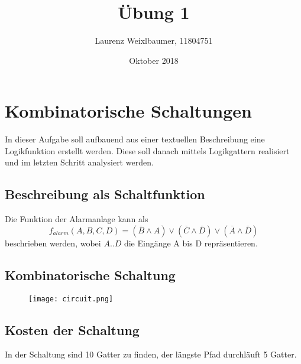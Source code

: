 \documentclass{article}
\title{Übung 1}
\author{Laurenz Weixlbaumer, 11804751}
\date{Oktober 2018}
\begin{document}
\maketitle

\section{Kombinatorische Schaltungen}
In dieser Aufgabe soll aufbauend aus einer textuellen Beschreibung eine Logikfunktion erstellt werden. Diese soll danach mittels Logikgattern realisiert und im letzten Schritt analysiert werden.

\subsection{Beschreibung als Schaltfunktion}

Die Funktion der Alarmanlage kann als
$$f_{alarm}(A,B,C,D) = (\overline{B} \land A) \lor (\overline{C} \land \overline{D}) \lor (\overline{A} \land \overline{D})$$
beschrieben werden, wobei $A..D$ die Eingänge A bis D repräsentieren.

\subsection{Kombinatorische Schaltung}

\begin{figure}[htp]
\texttt{[image: circuit.png]}
\end{figure}

\subsection{Kosten der Schaltung}

In der Schaltung sind 10 Gatter zu finden, der längste Pfad durchläuft 5 Gatter.
\end{document}
